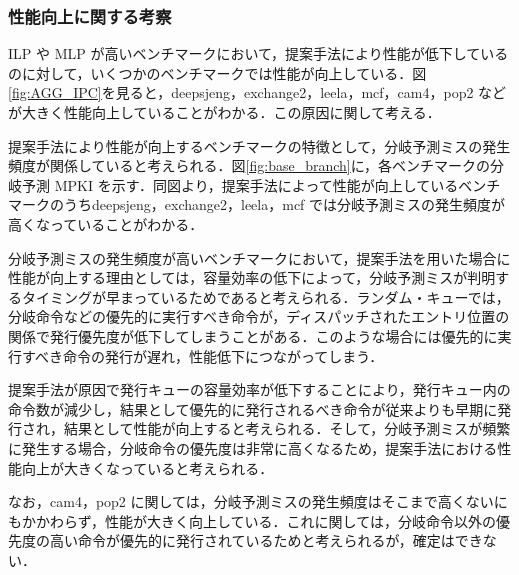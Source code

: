 \documentclass[twocolumn]{jsarticle}
\begin{document}
  \subsubsection{性能向上に関する考察}
  ILP や MLP が高いベンチマークにおいて，提案手法により性能が低下しているのに対して，いくつかのベンチマークでは性能が向上している．図\ref{fig:AGG_IPC}を見ると，deepsjeng，exchange2，leela，mcf，cam4，pop2 などが大きく性能向上していることがわかる．この原因に関して考える．

  提案手法により性能が向上するベンチマークの特徴として，分岐予測ミスの発生頻度が関係していると考えられる．図\ref{fig:base_branch}に，各ベンチマークの分岐予測 MPKI を示す．同図より，提案手法によって性能が向上しているベンチマークのうちdeepsjeng，exchange2，leela，mcf では分岐予測ミスの発生頻度が高くなっていることがわかる．

  分岐予測ミスの発生頻度が高いベンチマークにおいて，提案手法を用いた場合に性能が向上する理由としては，容量効率の低下によって，分岐予測ミスが判明するタイミングが早まっているためであると考えられる．ランダム・キューでは，分岐命令などの優先的に実行すべき命令が，ディスパッチされたエントリ位置の関係で発行優先度が低下してしまうことがある．このような場合には優先的に実行すべき命令の発行が遅れ，性能低下につながってしまう．

  提案手法が原因で発行キューの容量効率が低下することにより，発行キュー内の命令数が減少し，結果として優先的に発行されるべき命令が従来よりも早期に発行され，結果として性能が向上すると考えられる．そして，分岐予測ミスが頻繁に発生する場合，分岐命令の優先度は非常に高くなるため，提案手法における性能向上が大きくなっていると考えられる．

  なお，cam4，pop2 に関しては，分岐予測ミスの発生頻度はそこまで高くないにもかかわらず，性能が大きく向上している．これに関しては，分岐命令以外の優先度の高い命令が優先的に発行されているためと考えられるが，確定はできない．
\end{document}
